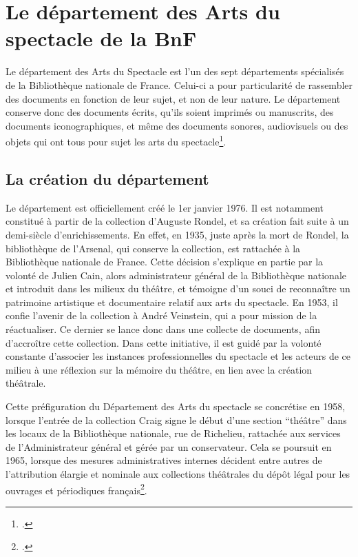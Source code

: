 
\chapter{Le département des Arts du spectacle de la BnF}

Le département des Arts du Spectacle est l'un des sept départements spécialisés de la Bibliothèque nationale de France. Celui-ci a pour particularité de rassembler des documents en fonction de leur sujet, et non de leur nature. Le département conserve donc des documents écrits, qu'ils soient imprimés ou manuscrits, des documents iconographiques, et même des documents sonores, audiovisuels ou des objets qui ont tous pour sujet les arts du spectacle\footcite[p. 8-9]{giteau_1995}.

\section{La création du département}

Le département est officiellement créé le 1er janvier 1976. Il est notamment constitué à partir de la collection d'Auguste Rondel, et sa création fait suite à un demi-siècle d'enrichissements. En effet, en 1935, juste après la mort de Rondel, la bibliothèque de l'Arsenal, qui conserve la collection, est rattachée à la Bibliothèque nationale de France. Cette décision s'explique en partie par la volonté de Julien Cain, alors administrateur général de la Bibliothèque nationale et introduit dans les milieux du théâtre, et témoigne d'un souci de reconnaître un patrimoine artistique et documentaire relatif aux arts du spectacle. En 1953, il confie l'avenir de la collection à André Veinstein, qui a pour mission de la réactualiser. Ce dernier se lance donc dans une collecte de documents, afin d'accroître cette collection. Dans cette initiative, il est guidé par la volonté constante d'associer les instances professionnelles du spectacle et les acteurs de ce milieu 
à une réflexion sur la mémoire du théâtre, en lien avec la création théâtrale. 

Cette préfiguration du Département des Arts du spectacle se concrétise en 1958, lorsque l'entrée de la collection Craig signe le début d'une section \enquote{théâtre} dans les locaux de la Bibliothèque nationale, rue de Richelieu, rattachée aux services de l'Administrateur général et gérée par un conservateur. Cela se poursuit en 1965, lorsque des mesures administratives internes décident entre autres de l'attribution élargie et nominale aux collections théâtrales du dépôt légal pour les ouvrages et périodiques français\footcite[p. 250]{giteau_2005}.

